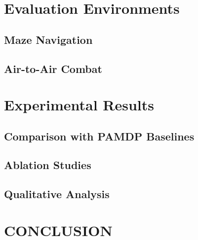 \documentclass[letterpaper, 10 pt, conference]{ieeeconf}
\begin{document}
\section{Evaluation Environments}

\subsection{Maze Navigation}

\subsection{Air-to-Air Combat}

\section{Experimental Results}

\subsection{Comparison with PAMDP Baselines}

\subsection{Ablation Studies}

\subsection{Qualitative Analysis}

\section{CONCLUSION}

\addtolength{\textheight}{0cm}   %
\end{document}
